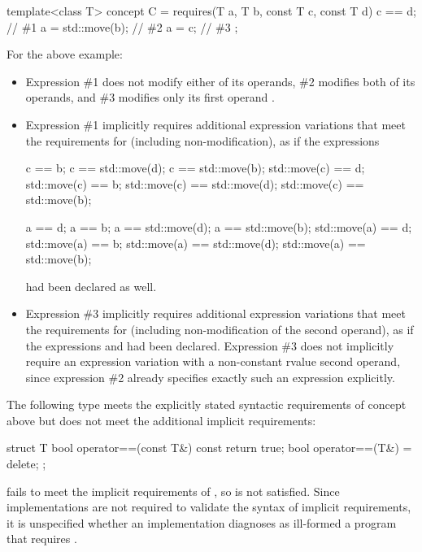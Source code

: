 \pnum
\begin{example}
\begin{codeblock}
template<class T> concept C = requires(T a, T b, const T c, const T d) {
  c == d;           // \#1
  a = std::move(b); // \#2
  a = c;            // \#3
};
\end{codeblock}

For the above example:
\begin{itemize}
\item
Expression \#1 does not modify either of its operands, \#2 modifies both of its
operands, and \#3 modifies only its first operand .

\item
Expression \#1 implicitly requires additional expression variations that meet
the requirements for  (including non-modification), as if the
expressions
\begin{codeblock}
                                            c  ==           b;
          c  == std::move(d);               c  == std::move(b);
std::move(c) ==           d;      std::move(c) ==           b;
std::move(c) == std::move(d);     std::move(c) == std::move(b);

          a  ==           d;                a  ==           b;
          a  == std::move(d);               a  == std::move(b);
std::move(a) ==           d;      std::move(a) ==           b;
std::move(a) == std::move(d);     std::move(a) == std::move(b);
\end{codeblock}
had been declared as well.

\item
Expression \#3 implicitly requires additional expression variations that meet
the requirements for  (including non-modification of the second
operand), as if the expressions  and  had
been declared. Expression \#3 does not implicitly require an expression
variation with a non-constant rvalue second operand, since expression \#2
already specifies exactly such an expression explicitly.
\end{itemize}
\end{example}

\pnum
\begin{example}
The following type  meets the explicitly stated syntactic requirements
of concept  above but does not meet the additional implicit
requirements:

\begin{codeblock}
struct T {
  bool operator==(const T&) const { return true; }
  bool operator==(T&) = delete;
};
\end{codeblock}

 fails to meet the implicit requirements of , so 
is not satisfied. Since implementations are not required to validate the syntax
of implicit requirements, it is unspecified whether an implementation diagnoses
as ill-formed a program that requires .
\end{example}

